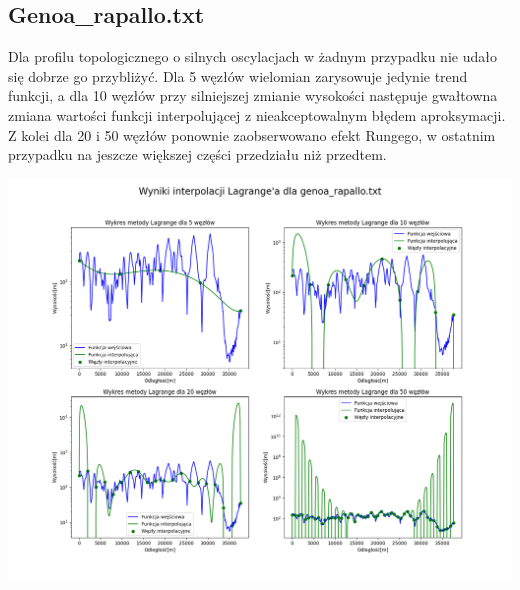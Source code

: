 \documentclass[a4paper,12pt]{article}
\begin{document}
   	\subsection{Genoa\_rapallo.txt}
	Dla profilu topologicznego o silnych oscylacjach w żadnym przypadku nie udało się dobrze go przybliżyć. Dla 5 węzłów wielomian zarysowuje jedynie trend funkcji, a dla 10 węzłów przy silniejszej zmianie wysokości następuje gwałtowna zmiana wartości funkcji interpolującej z nieakceptowalnym błędem aproksymacji. Z kolei dla 20 i 50 węzłów ponownie zaobserwowano efekt Rungego, w ostatnim przypadku na jeszcze większej części przedziału niż przedtem.
	\begin{center}
        \includegraphics[scale=0.4]{../charts/lagrange_genoa_rapallo.png}
    \end{center}
    
    \newpage
\end{document}
